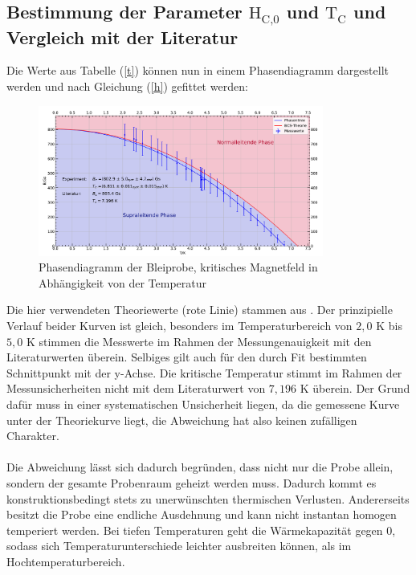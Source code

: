 \documentclass[german,  %
parskip=full,  %
]{scrartcl}
\begin{document}
\subsection{Bestimmung der Parameter $\text{H}_{\text{C,0}}$ und $\text{T}_{\text {C}}$ und Vergleich mit der Literatur}
Die Werte aus Tabelle (\ref{t}) können nun in einem Phasendiagramm dargestellt werden und nach Gleichung (\ref{h}) gefittet werden:
\begin{figure}[h!]
\centering
\includegraphics[width=0.835\textwidth]{Phasendiagramm_Blei.pdf}
\caption{Phasendiagramm der Bleiprobe, kritisches Magnetfeld in Abhängigkeit von der Temperatur}
\end{figure}
\newpage
Die hier verwendeten Theoriewerte (rote Linie) stammen aus \cite{6}. Der prinzipielle Verlauf beider Kurven ist gleich, besonders im Temperaturbereich von $2,0$ K bis $5,0$ K stimmen die Messwerte im Rahmen der Messungenauigkeit mit den Literaturwerten überein. Selbiges gilt auch für den durch Fit bestimmten Schnittpunkt mit der y-Achse. Die kritische Temperatur stimmt im Rahmen der Messunsicherheiten nicht mit dem Literaturwert von $7,196$ K überein. Der Grund dafür muss in einer systematischen Unsicherheit liegen, da die gemessene Kurve unter der Theoriekurve liegt, die Abweichung hat also keinen zufälligen Charakter.
\\\\
Die Abweichung lässt sich dadurch begründen, dass nicht nur die Probe allein, sondern der gesamte Probenraum geheizt werden muss. Dadurch kommt es konstruktionsbedingt stets zu unerwünschten thermischen Verlusten. Andererseits besitzt die Probe eine endliche Ausdehnung und kann nicht instantan homogen temperiert werden. Bei tiefen Temperaturen geht die Wärmekapazität gegen $0$, sodass sich Temperaturunterschiede leichter ausbreiten können, als im Hochtemperaturbereich.
\end{document}
